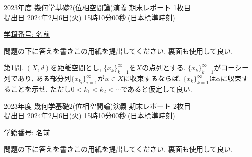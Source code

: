\documentclass[dvipdfmx,a4paper,11pt]{article}
\theoremstyle{definition}
\begin{document}
\pagestyle{empty}


\begin{center}
{\Large 2023年度 幾何学基礎2(位相空間論)演義 期末レポート 1枚目} \\

\vspace{5pt}
{ \large 提出日 2024年2月6日(火) 15時10分00秒 (日本標準時刻)}
\end{center}

\vspace{2pt}
\begin{flushleft}
{ \large \underline{学籍番号: \hspace{4cm} 名前  \hspace{8cm} } }
\end{flushleft}

\begin{center}
 {\large 問題の下に答えを書きこの用紙を提出してください. 裏面も使用して良い.}
  \end{center}
  
   {\large 第1問.} $(X,d)$を距離空間とし, $\{ x_{k}\}_{k=1}^{\infty}$を$X$の点列とする.  $\{ x_{k}\}_{k=1}^{\infty}$がコーシー列であり, ある部分列$\{ x_{k_{i}}\}_{i=1}^{\infty}$が$\alpha \in X$に収束するならば, $\{ x_{k}\}_{k=1}^{\infty}$は$\alpha$に収束することを示せ. ただし$0<k_1<k_2<\cdots$であると仮定して良い. 
   

\newpage

\begin{center}
{\Large 2023年度 幾何学基礎2(位相空間論)演義 期末レポート 2枚目} \\

\vspace{5pt}
{ \large 提出日 2024年2月6日(火) 15時10分00秒 (日本標準時刻)}
\end{center}

\vspace{2pt}
\begin{flushleft}
{ \large \underline{学籍番号: \hspace{4cm} 名前  \hspace{8cm} } }
\end{flushleft}

\begin{center}
 {\large 問題の下に答えを書きこの用紙を提出してください. 裏面も使用して良い.}
  \end{center}
  
\end{document}
